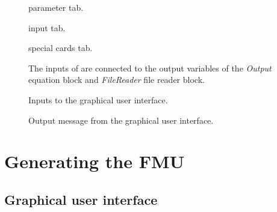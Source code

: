 \begin{figure}[h!]
\vspace*{5mm}
\caption{\typeb parameter tab.}
\label{fig:type_parameter_tab}
\end{figure}

\begin{figure}[h!]
\caption{\typeb input tab.}
\label{fig:type_input_tab}
\end{figure}


\begin{figure}[h!]
\caption{\typeb special cards tab.}
\label{fig:type_special_cards_tab}
\end{figure}

\begin{figure}[h!]
\vspace*{5mm}
\vspace*{5mm}
\caption{The inputs of \typeb are connected to the output variables of the \emph{Output} equation block and \emph{FileReader} file reader block.}
\label{fig:type_connection}
\end{figure}


\begin{figure}[h!]
\caption{Inputs to the graphical user interface.}
\label{fig:trnsys_fmu_create_example_gui}
\end{figure}

\begin{figure}[h!]
\caption{Output message from the graphical user interface.}
\label{fig:trnsys_fmu_create_example_result}
\end{figure}

\clearpage

\section{Generating the FMU}

\subsection{Graphical user interface}

